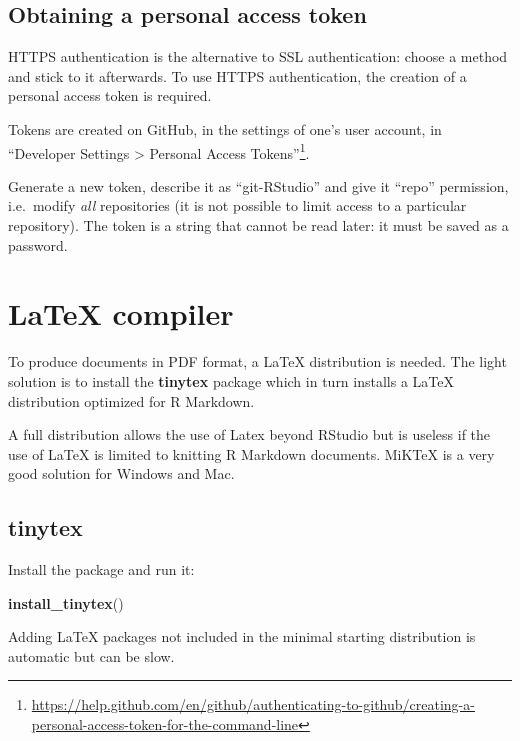 \documentclass[
  12pt,
  american,
  a4paper,
  extrafontsizes,onecolumn,openright
  ]{memoir}
\newenvironment{Shaded}{\begin{snugshade}}{\end{snugshade}}
\newcommand{\FunctionTok}[1]{\textcolor[rgb]{0.13,0.29,0.53}{\textbf{#1}}}
\newcommand{\NormalTok}[1]{#1}
\begin{document}
\subsection{Obtaining a personal access token}\label{sec:pat}

HTTPS authentication is the alternative to SSL authentication: choose a method and stick to it afterwards.
To use HTTPS authentication, the creation of a personal access token is required.

Tokens are created on GitHub, in the settings of one's user account, in \enquote{Developer Settings \textgreater{} Personal Access Tokens}\footnote{\url{https://help.github.com/en/github/authenticating-to-github/creating-a-personal-access-token-for-the-command-line}}.

Generate a new token, describe it as \enquote{git-RStudio} and give it \enquote{repo} permission, i.e.~modify \emph{all} repositories (it is not possible to limit access to a particular repository).
The token is a string that cannot be read later: it must be saved as a password.

\section{LaTeX compiler}\label{latex-compiler}

To produce documents in PDF format, a LaTeX distribution is needed.
The light solution is to install the \textbf{tinytex} package which in turn installs a LaTeX distribution optimized for R Markdown.

A full distribution allows the use of Latex beyond RStudio but is useless if the use of LaTeX is limited to knitting R Markdown documents.
MiKTeX is a very good solution for Windows and Mac.

\subsection{tinytex}\label{tinytex}

Install the package and run it:

\scriptsize

\begin{Shaded}
\begin{Highlighting}[]
\FunctionTok{install\_tinytex}\NormalTok{()}
\end{Highlighting}
\end{Shaded}

\normalsize

Adding LaTeX packages not included in the minimal starting distribution is automatic but can be slow.
\end{document}
